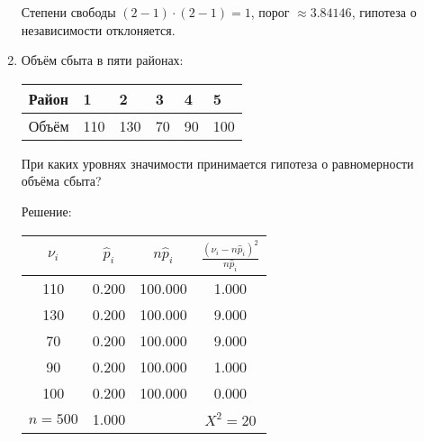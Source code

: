 \documentclass[a4paper,12pt]{article}
\newif\ifsolutions
\begin{document}
\begin{enumerate}
                  Степени свободы $(2-1) \cdot (2-1) = 1$, порог $\approx 3.84146$, гипотеза о независимости отклоняется.
            \fi

      \item \cite[285]{Efimov} Объём сбыта в пяти районах:

            \begin{center}
                  \begin{tabular}{|P{1.5cm}|P{1cm}|P{1cm}|P{1cm}|P{1cm}|P{1cm}|}
                        \hline
                        Район & 1   & 2   & 3  & 4  & 5   \\
                        \hline
                        Объём & 110 & 130 & 70 & 90 & 100 \\
                        \hline
                  \end{tabular}
            \end{center}

            При каких уровнях значимости принимается гипотеза о равномерности объёма сбыта?

            \ifsolutions Решение: \par
                  \begin{tabular}{|c|c|c|c|}
                        \hline
                        $\nu_i$   & $\widehat{p}_i$ & $n \widehat{p}_i$ & $\frac{(\nu_i - n \widehat{p}_i)^2}{n \widehat{p}_i}$ \\
                        \hline
                        110       & 0.200           & 100.000           & 1.000                                                 \\
                        130       & 0.200           & 100.000           & 9.000                                                 \\
                        70        & 0.200           & 100.000           & 9.000                                                 \\
                        90        & 0.200           & 100.000           & 1.000                                                 \\
                        100       & 0.200           & 100.000           & 0.000                                                 \\
                        \hline
                        $n = 500$ & 1.000           &                   & $X^2 = 20$                                            \\
                        \hline
                  \end{tabular}


\end{enumerate}
\end{document}
